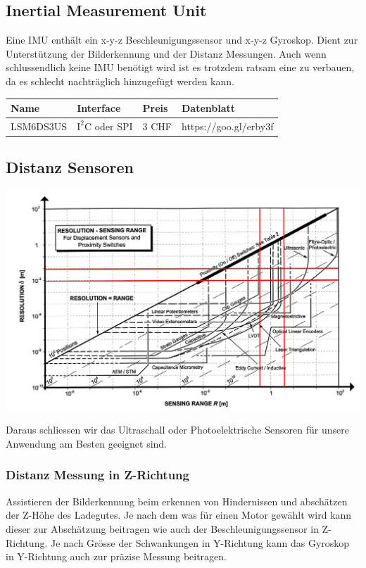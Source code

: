 \documentclass[a4paper]{report}
\begin{document}
\vspace{1em}
\noindent

\subsection{Inertial Measurement Unit}
Eine IMU enthält ein x-y-z Beschleunigungssensor und x-y-z
Gyroskop. Dient zur Unterstützung der Bilderkennung und der Distanz
Messungen. Auch wenn schlussendlich keine IMU benötigt wird ist es trotzdem
ratsam eine zu verbauen, da es schlecht nachträglich hinzugefügt werden kann.

\vspace{1em}
\noindent
\begin{tabular}{|p{}|p{}|p{}|p{}|}
  \hline
  \textbf{Name} & \textbf{Interface} & \textbf{Preis} & \textbf{Datenblatt} \\
  \hline
  LSM6DS3US & $\text{I}^2\text{C}$ oder SPI & 3 CHF & https://goo.gl/erby3f \\
  \hline
\end{tabular}

\subsection{Distanz Sensoren}
\includegraphics[width=\textwidth]{DistanzSensor}

Daraus schliessen wir das Ultraschall oder Photoelektrische
Sensoren für unsere Anwendung am Besten geeignet sind.

\subsubsection{Distanz Messung in Z-Richtung}
Assistieren der Bilderkennung beim erkennen von Hindernissen und
abschätzen der Z-Höhe des Ladegutes. Je nach dem was für einen Motor gewählt
wird kann dieser zur Abschätzung beitragen wie auch der Beschleunigungssensor
in Z-Richtung. Je nach Grösse der Schwankungen in Y-Richtung kann das Gyroskop
in Y-Richtung auch zur präzise Messung beitragen.
\end{document}
